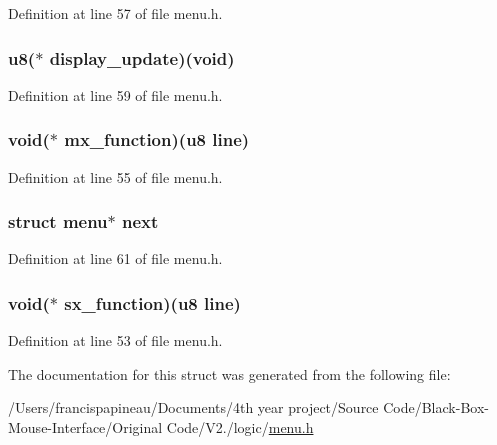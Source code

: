 \-Definition at line 57 of file menu.\-h.

\hypertarget{structmenu_ab8460526701ec3ad0a231a398a963882}{
\subsubsection[{display\-\_\-update}]{\setlength{\rightskip}{0pt plus 5cm}u8($\ast$ {\bf display\-\_\-update})(void)}}\label{structmenu_ab8460526701ec3ad0a231a398a963882}


\-Definition at line 59 of file menu.\-h.

\hypertarget{structmenu_a5e810089609d71c50a4fafb16304fc44}{
\subsubsection[{mx\-\_\-function}]{\setlength{\rightskip}{0pt plus 5cm}void($\ast$ {\bf mx\-\_\-function})(u8 line)}}\label{structmenu_a5e810089609d71c50a4fafb16304fc44}


\-Definition at line 55 of file menu.\-h.

\hypertarget{structmenu_aa35c173e9c9b7cab0ea757bbfd988893}{
\subsubsection[{next}]{\setlength{\rightskip}{0pt plus 5cm}struct {\bf menu}$\ast$ {\bf next}}}\label{structmenu_aa35c173e9c9b7cab0ea757bbfd988893}


\-Definition at line 61 of file menu.\-h.

\hypertarget{structmenu_ab821fa0d7f541480110bc8a674b42c79}{
\subsubsection[{sx\-\_\-function}]{\setlength{\rightskip}{0pt plus 5cm}void($\ast$ {\bf sx\-\_\-function})(u8 line)}}\label{structmenu_ab821fa0d7f541480110bc8a674b42c79}


\-Definition at line 53 of file menu.\-h.



\-The documentation for this struct was generated from the following file\-:\begin{DoxyCompactItemize}
\item 
/\-Users/francispapineau/\-Documents/4th year project/\-Source Code/\-Black-\/\-Box-\/\-Mouse-\/\-Interface/\-Original Code/\-V2./logic/\hyperlink{menu_8h}{menu.\-h}\end{DoxyCompactItemize}
